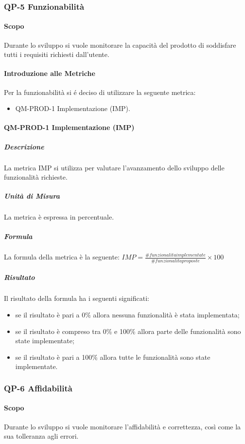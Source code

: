 	\subsubsection{QP-5 Funzionabilità}
		\paragraph{Scopo}
			Durante lo sviluppo si vuole monitorare la capacità del prodotto di soddisfare tutti i requisiti richiesti dall'utente.
		\paragraph{Introduzione alle Metriche}
			Per la funzionabilità si é deciso di utilizzare la seguente metrica:
			\begin{itemize}
				\item QM-PROD-1 Implementazione (IMP).
			\end{itemize}
		\paragraph{QM-PROD-1 Implementazione (IMP)}
			\subparagraph{Descrizione}
				La metrica IMP si utilizza per valutare l'avanzamento dello sviluppo delle funzionalità richieste.
			\subparagraph{Unità di Misura}
				La metrica è espressa in percentuale.
			\subparagraph{Formula}
				La formula della metrica è la seguente:
				\(
					IMP = \frac{\# funzionalita implementate}{\# funzionalita proposte}\times100
				\)
			\subparagraph{Risultato}
				Il risultato della formula ha i seguenti significati:
				\begin{itemize}
					\item se il risultato è pari a 0\% allora nessuna funzionalità è stata implementata;
					\item se il risultato è compreso tra 0\% e 100\% allora parte delle funzionalità sono state implementate;
					\item se il risultato è pari a 100\% allora tutte le funzionalità sono state implementate.
				\end{itemize}

	\subsubsection{QP-6 Affidabilità}
		\paragraph{Scopo}
		Durante lo sviluppo si vuole monitorare l'affidabilità e correttezza, così come la sua tolleranza agli errori.
